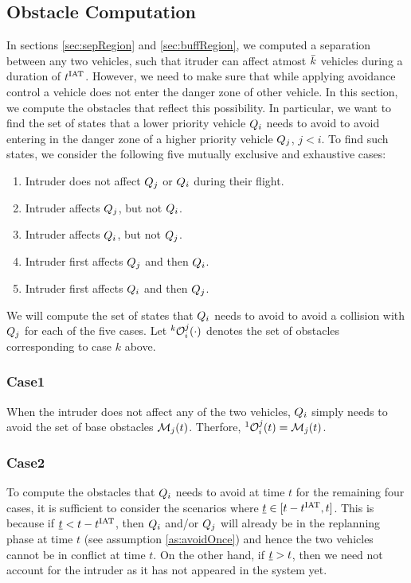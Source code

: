 \subsection{Obstacle Computation} \label{sec:intruderObs}

In sections \ref{sec:sepRegion} and \ref{sec:buffRegion}, we computed a separation between any two vehicles, such that itruder can affect atmost $\bar{k}$ vehicles during a duration of $t^\text{IAT}$. However, we need to make sure that while applying avoidance control a vehicle does not enter the danger zone of other vehicle. In this section, we compute the obstacles that reflect this possibility. In particular, we want to find the set of states that a lower priority vehicle $Q_i$ needs to avoid to avoid entering in the danger zone of a higher priority vehicle $Q_j$, $j < i$. To find such states, we consider the following five mutually exclusive and exhaustive cases:
\begin{enumerate}
\item Intruder does not affect $Q_j$ or $Q_i$ during their flight.
\item Intruder affects $Q_j$, but not $Q_i$.
\item Intruder affects $Q_i$, but not $Q_j$.
\item Intruder first affects $Q_j$ and then $Q_i$.
\item Intruder first affects $Q_i$ and then $Q_j$.
\end{enumerate}
We will compute the set of states that $Q_i$ needs to avoid to avoid a collision with $Q_j$ for each of the five cases. Let $^k\mathcal{O}_i^j(\cdot)$ denotes the set of obstacles corresponding to case $k$ above. 

\subsubsection{Case1} \label{sec:intruderObs_case1}
When the intruder does not affect any of the two vehicles, $Q_i$ simply needs to avoid the set of base obstacles $\mathcal{M}_j(t)$. Therfore, $^1\mathcal{O}_i^j(t) = \mathcal{M}_j(t)$.

\subsubsection{Case2} \label{sec:intruderObs_case2}
To compute the obstacles that $Q_i$ needs to avoid at time $t$ for the remaining four cases, it is sufficient to consider the scenarios where $\underline{t} \in [t-t^\text{IAT}, t]$. This is because if $\underline{t} < t - t^\text{IAT}$, then $Q_i$ and/or $Q_j$ will already be in the replanning phase at time $t$ (see assumption \ref{as:avoidOnce}) and hence the two vehicles cannot be in conflict at time $t$. On the other hand, if $\underline{t} > t$, then we need not account for the intruder as it has not appeared in the system yet. 

